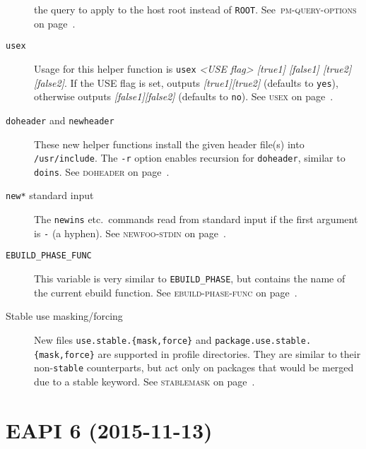 \documentclass[a4paper,nofoldmark]{leaflet}
\newcommand{\code}[1]{\texttt{#1}}
\newcommand{\featureref}[1]{\textsc{#1} on page~\pageref{feat:#1}}
\begin{document}
\begin{description}
    the query to apply to the host root instead of \code{ROOT}.
    See~\featureref{pm-query-options}.
    \item[\code{usex}] Usage for this helper function is
    \code{usex} \emph{<USE flag> [true1] [false1] [true2] [false2]}.
    If the USE flag is set, outputs \emph{[true1][true2]}
    (defaults to \code{yes}), otherwise outputs
    \emph{[false1][false2]} (defaults to \code{no}).
    See \featureref{usex}.
    \item[\code{doheader} and \code{newheader}] These new helper
    functions install the given header file(s) into
    \code{/usr/include}. The \code{-r} option enables recursion for
    \code{doheader}, similar to \code{doins}.
    See \featureref{doheader}.
    \item[\code{new*} standard input] The \code{newins} etc.\ commands
    read from standard input if the first argument is \code{-}
    (a hyphen).
    See \featureref{newfoo-stdin}.
    \item[\code{EBUILD_PHASE_FUNC}] This variable is very similar to
    \code{EBUILD_PHASE}, but contains the name of the current ebuild
    function.
    See \featureref{ebuild-phase-func}.
    \item[Stable use masking/forcing] New files
    \code{use.stable.\allowbreak\{mask,force\}} and
    \code{package.use.stable.\allowbreak\{mask,force\}}
    are supported in profile directories.  They are similar to their
    non-\code{stable} counterparts, but act only on packages that
    would be merged due to a stable keyword.
    See \featureref{stablemask}.
\end{description}

\section{EAPI 6 (2015-11-13)}
\label{sec:cs:eapi6}
\end{document}
